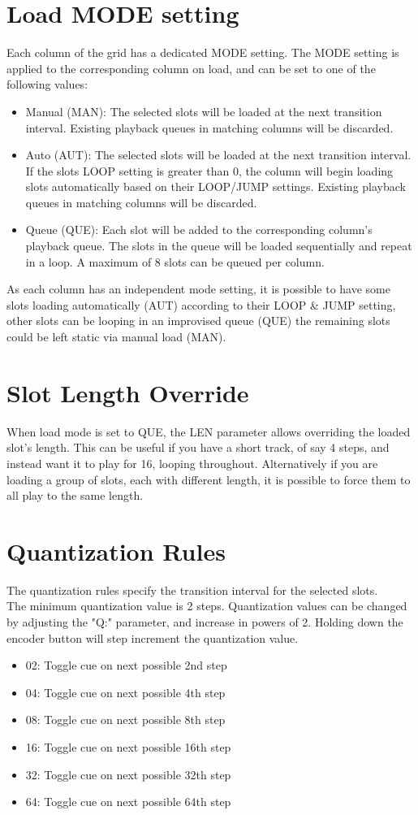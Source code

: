 \section{Load MODE setting}
Each column of the grid has a dedicated MODE setting. The MODE setting is applied to the corresponding column on load, and can be set to one of the following values:

\begin{itemize}
    \item Manual (MAN):  The selected slots will be loaded at the next transition interval. Existing playback queues in matching columns will be discarded.
    \item Auto (AUT): The selected slots will be loaded at the next transition interval. If the slots LOOP setting is greater than 0, the column will begin loading slots automatically based on their LOOP/JUMP settings. Existing playback queues in matching columns will be discarded.
    \item Queue (QUE): Each slot will be added to the corresponding column's playback queue. The slots in the queue will be loaded sequentially and repeat in a loop. A maximum of 8 slots can be queued per column. 
\end{itemize}

As each column has an independent mode setting, it is possible to have some slots loading automatically (AUT) according to their LOOP \& JUMP setting, other slots can be looping in an improvised queue (QUE) the remaining slots could be left static via manual load (MAN).
\newpage
\section{Slot Length Override}
When load mode is set to QUE, the LEN parameter allows overriding the loaded slot's length. This can be useful if you have a short track, of say 4 steps, and instead want it to play for 16, looping throughout. Alternatively if you are loading a group of slots, each with different length, it is possible to force them to all play to the same length.

\section{Quantization Rules}
The quantization rules specify the transition interval for the selected slots.\\
The minimum quantization value is 2 steps. Quantization values can be changed by adjusting the "Q:" parameter, and increase in powers of 2. Holding down the encoder button will step increment the quantization value.
\begin{itemize}
\item 02: Toggle cue on next possible 2nd step
\item 04: Toggle cue on next possible 4th step
\item 08: Toggle cue on next possible 8th step 
\item 16: Toggle cue on next possible 16th step 
\item 32: Toggle cue on next possible 32th step 
\item 64: Toggle cue on next possible 64th step
\end{itemize}
